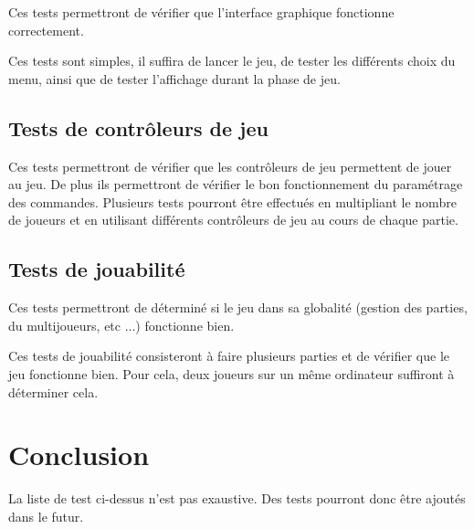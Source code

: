 Ces tests permettront de vérifier que l'interface graphique fonctionne correctement.

Ces tests sont simples, il suffira de lancer le jeu, de tester les différents choix du menu, ainsi que de tester l'affichage durant la phase de jeu.

\subsection{Tests de contrôleurs de jeu}

Ces tests permettront de vérifier que les contrôleurs de jeu permettent de jouer au jeu.
De plus ils permettront de vérifier le bon fonctionnement du paramétrage des commandes.
Plusieurs tests pourront être effectués en multipliant le nombre de joueurs et en utilisant différents contrôleurs de jeu au cours de chaque partie.

\subsection{Tests de jouabilité}

Ces tests permettront de déterminé si le jeu dans sa globalité (gestion des parties, du multijoueurs, etc ...) fonctionne bien.

Ces tests de jouabilité consisteront à faire plusieurs parties et de vérifier que le jeu fonctionne bien. Pour cela, deux joueurs sur un même ordinateur suffiront à déterminer cela.

\newpage

\section*{Conclusion}

La liste de test ci-dessus n'est pas exaustive. Des tests pourront donc être ajoutés dans le futur.
